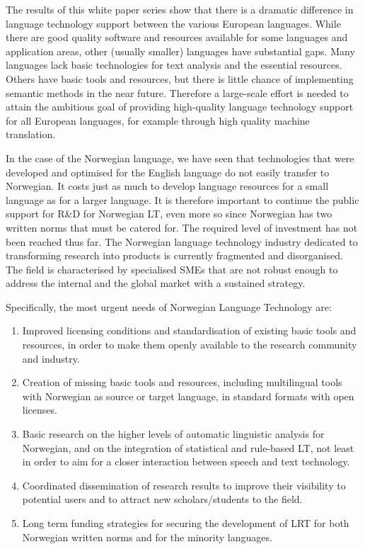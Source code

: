 \begin{multicols}{2}
The results of this white paper series show that there is a dramatic difference in language technology support between the various European languages. While there are good quality software and resources available for some languages and application areas, other (usually smaller) languages have substantial gaps. Many languages lack basic technologies for text analysis and the essential resources. Others have basic tools and resources, but there is little chance of implementing semantic methods in the near future. Therefore a large-scale effort is needed to attain the ambitious goal of providing high-quality language technology support for all European languages, for example through high quality machine translation. 

In the case of the Norwegian language, we have seen that technologies that were developed and optimised for the English language do not easily transfer to Norwegian. 
It costs just as much to develop language resources for a small language as for a larger language. 
It is therefore important to continue the public support for R\&D for Norwegian LT, even more so since Norwegian has two written norms that must be catered for. 
The required level of investment has not been reached thus far. The Norwegian language technology industry dedicated to transforming research into products is currently fragmented and disorganised. The field is characterised by specialised SMEs that are not robust enough to address the internal and the global market with a sustained strategy. 

Specifically, the most urgent needs of Norwegian Language Technology are:
\begin{enumerate}
\item Improved licensing conditions and standardisation of existing basic tools and resources, in order to make them openly available to the research community and industry.
\item Creation of missing basic tools and resources, including multilingual tools with Norwegian as source or target language, in standard formats with open licenses.
\item Basic research on the higher levels of automatic linguistic analysis for Norwegian, and on the integration of statistical and rule-based LT, not least in order to aim for a closer interaction between speech and text technology.
\item Coordinated dissemination of research results to improve their visibility to potential users and to attract new scholars/students to the field.
\item Long term funding strategies for securing the development of LRT for both Norwegian written norms and for the minority languages.
\end{enumerate}


\end{multicols}
